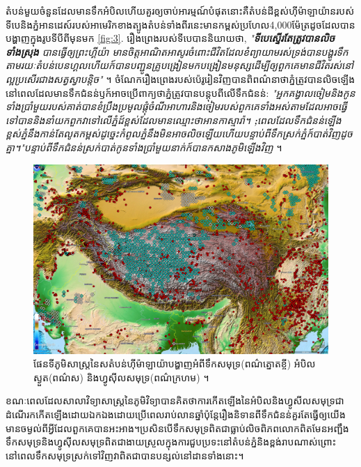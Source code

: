 \documentclass[10pt,twocolumn,letterpaper]{article}
\begin{document}
តំបន់មួយចំនួនដែលមានទឹកអំបិលហើយគួរឲ្យចាប់អារម្មណ៍បំផុតនោះគឺតំបន់ដីខ្ពស់ហ៊ីម៉ាឡាយ៉ានរបស់ទីបេ​និងភ្នំអានដេស៍​របស់អាមេរិកខាងត្បូង​តំបន់ទាំងពីរនេះមានកម្ពស់ប្រហែល​4,000ម៉ែត្រ​ដូចដែលបានបង្ហាញក្នុងរូបទីបីពីមុនមក \ref{fig:3}. រឿងព្រេងរបស់ទីបេបាននិយាយថា, \textit{"\textbf{ទីបេស្ទើរតែត្រូវបានលិចទាំងស្រុង} បានធ្វើឲ្យព្រះហ្គីយ៉ា មានចិត្តអាណិតអាសូរចំពោះជីវិតដែលខំព្យាយាមរស់​ទ្រង់បានបង្ហូរទឹកតាមរយៈតំបន់បេនហ្គលហើយក៍បានបញ្ជូនគ្រូបង្រៀនមកបង្រៀនមនុស្សដើម្បីឲ្យពួកគេមានជីវិតរស់នៅល្អប្រសើរជាងសត្វស្វាបន្តិច"} \cite{3}។ ចំណែករឿងព្រេងរបស់ប៉េរូរៀនវិញបានពិពណ៌នាថាភ្នំត្រូវបានលិចឡើងនៅពេលដែលមានទឹកជំនន់ឫក៍អាចប្រើពាក្យថាភ្នំត្រូវបានបន្តុបពីលើទឹកជំនន់: \textit{"អ្នកគង្វាលចៀម​និងកូនទាំងប្រាំមួយរបស់គាត់បានខំប្រឹងប្រមូលផ្តុំចំណីអាហារនិងចៀមរបស់ពួកគេទាំងអស់តាមដែលអាចធ្វើទៅបាន​និងនាំយកពួកវាទៅលើភ្នំដ៍ខ្ពស់ដែលមានឈ្មោះថា​អានកាស្មារ៉ា។ \textbf;{ពេលដែលទឹកជំនន់ឡើងខ្ពស់​ភ្នំនឹងកាន់តែលូតកម្ពស់​ដូច្នេះកំពូលភ្នំនឹងមិនអាចលិចឡើយ​ហើយបន្ទាប់ពីទឹកស្រក់ភ្នំក៍បាត់វិញដូចគ្នា។"}បន្ទាប់ពីទឹកជំនន់ស្រក់បាត់កូនទាំងប្រាំមួយនាក់ក៍បានកសាងភូមិឡើងវិញ} \cite{3}។ 

\begin{figure}[t]
\begin{center}
   \includegraphics[width=1\linewidth]{tibet.jpg}
\end{center}
   \caption{ផែនទីភូមិសាស្ត្រនៃសតំបន់ហ៊ីម៉ាឡាយ៉ាបង្ហាញអំពីទឹកសមុទ្រ(ពណ៌ត្នោតខ្ចី) អំបិលស្ងួត(ពណ៌ស) និងហ្វូស៊ីលសមុទ្រ(ពណ៌ក្រហម) \cite{15,16,86,87}។}
\label{fig:3}
\label{fig:onecol}
\end{figure}

ខណៈពេលដែលសាលាវិទ្យាសាស្ត្រនៃភូមិវិទ្យាបានគិតថាការកើតឡើងនៃអំបិលនិងហ្វូសីលសមុទ្រជាដំណើរកកើតឡើងដោយឯកឯងដោយប្រើពេលរាប់លានឆ្នាំ​ប៉ុន្តែរឿងនិទានពីទឹកជំនន់គួរតែធ្វើឲ្យយើងមានចម្ងល់ពីអ្វីដែលពួកគេបានអះអាង។ប្រសិនបើទឹកសមុទ្រពិតជាធ្លាប់លិចពិភពលោកពិតមែន​អញ្ជឹងទឹកសមុទ្រនិងហ្វូស៊ីលសមុទ្រ​ពិតជាងាយស្រួលក្នុងការជួបប្រទះនៅតំបន់ភ្នំនិងខ្ពង់រាបណាស់​ព្រោះនៅពេលទឹកសមុទ្រស្រក់ទៅវិញវាពិតជាបានបន្សល់នៅដានទាំងនោះ។
\end{document}
